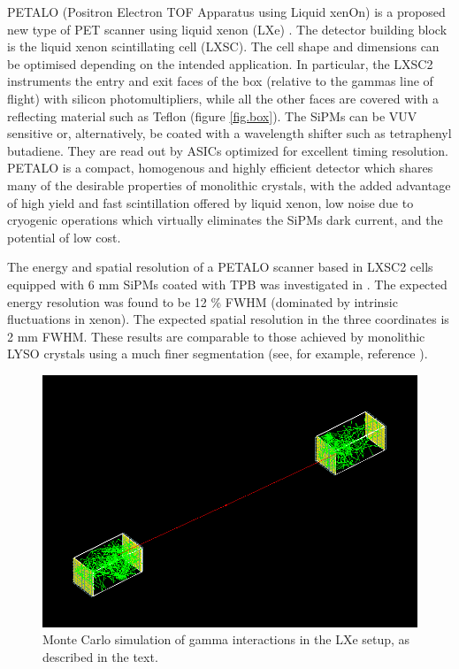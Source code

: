 \documentclass[review]{elsarticle}
\begin{document}
PETALO (Positron Electron TOF Apparatus using Liquid xenOn) is a proposed new type of PET scanner using liquid xenon (LXe) \cite{Petalo2015}. The detector building block is the liquid xenon scintillating cell (LXSC). The cell shape and dimensions can be optimised depending on the intended application. In particular, the LXSC2 instruments the entry and exit faces of the box (relative to the gammas line of flight) with silicon photomultipliers, while all the other faces are covered with a reflecting material such as Teflon (figure \ref{fig.box}). The SiPMs can be VUV sensitive or, alternatively, be coated with a wavelength shifter such as tetraphenyl butadiene. They are read out by ASICs optimized for excellent timing resolution. PETALO is a compact, homogenous and highly efficient detector which shares many of the desirable properties of monolithic crystals, with the added advantage of high yield and fast scintillation offered by liquid xenon, low noise due to cryogenic operations which virtually eliminates the SiPMs dark current, and the potential of low cost. 

The energy and spatial resolution of a PETALO scanner based in LXSC2 cells equipped with 6 mm SiPMs coated with TPB was investigated in \cite{Petalo2015}. The expected energy resolution was found to be 12 \% FWHM (dominated by intrinsic fluctuations in xenon). The expected spatial resolution in the three coordinates is 2 mm FWHM. These results are  comparable to those achieved by monolithic LYSO crystals using a much finer segmentation 
(see, for example, reference \cite{VanDamm2011}). 

 \begin{figure}[!bthp]
	\centering
	\includegraphics[scale=0.4]{../img/PetaloSetup.png}
	\caption{\label{fig.psetup} Monte Carlo simulation of gamma interactions in the LXe setup, as 
	described in the text.}
\end{figure}
\end{document}
